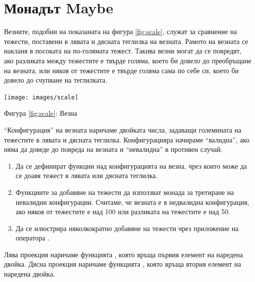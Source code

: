\section {Монадът Maybe}

\begin{mdframed}[hidealllines=true,backgroundcolor=gray!20]
	Везните, подобни на показаната на фигура \ref{fig:scale}, служат за сравнение на тежести, поставени в лявата и дясната теглилка на везната. Рамото на везната се накланя в посоката на по-голямата тежест. Такива везни могат да се повредят, ако разликата между тежестите е твърде голяма, което би довело до преобръщане на везната, или някоя от тежестите е твърде голяма сама по себе си, което би довело до счупване на теглилката. 

	\begin{center}
		\texttt{[image: images/scale]}	
		\label{fig:scale}
	\end{center}
	\begin{center}
		\tiny{Фигура \ref{fig:scale}: Везна}
	\end{center}
	

	``Конфигурация'' на везната наричаме двойката числа, задаващи големината на тежестите в лявата и дясната теглилка. Конфигурацияра начираме ``валидна'', ако няма да доведе до повреда на везната и ``невалидна'' в противен случай.
\end{mdframed}	

\begin{enumerate}[]
	\item Да се дефинират функции над конфигурацията на везна, чрез които може да се доавя тежест в лявата или дясната теглилка.
	\item Функциите за добавяне на тежести да използват монада  за третиране на невалидни конфигурации. Считаме, че везната е в недвалидна конфигурация, ако някоя от тежестите е над 100 или разликата на тежестите е над 50.
	\item Да се илюстрира няколкократно добавяне на тежести чрез приложение на оператора \code{>{}>=}.
\end{enumerate}

\begin{mdframed}[hidealllines=true,backgroundcolor=gray!20]
Лява проекция наричаме функцията , която връща първия елемент на наредена двойка. Дясна проекция наричаме функцията , която връща втория елемент на наредена двойка. 
\end{mdframed}


